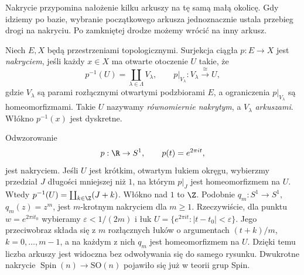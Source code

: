 Nakrycie przypomina nałożenie kilku arkuszy
na tę samą małą okolicę. Gdy idziemy po bazie,
wybranie początkowego arkusza jednoznacznie
ustala przebieg drogi na nakryciu.
Po zamkniętej drodze możemy wrócić na inny arkusz.

\begin{definicja}
\label{def:nakrycie}
Niech $E,X$ będą przestrzeniami topologicznymi.
Surjekcja ciągła $p:E\to X$ jest \emph{nakryciem},
jeśli każdy $x\in X$ ma otwarte otoczenie $U$
takie, że
\[
 p^{-1}(U)=\coprod_{\lambda\in\Lambda}V_\lambda,
 \qquad
 p|_{V_\lambda}:V_\lambda\xrightarrow{\cong}U,
\]
gdzie $V_\lambda$ są parami rozłącznymi
otwartymi podzbiorami $E$, a ograniczenia $p|_{V_\lambda}$
są homeomorfizmami.
Takie $U$ nazywamy \emph{równomiernie nakrytym},
a $V_\lambda$ \emph{arkuszami}.
Włókno $p^{-1}(x)$ jest dyskretne.
\end{definicja}

\begin{przyklad}
\label{prz:exp-nakrycie}
Odwzorowanie
\[
 p:\R\to S^1,\qquad p(t)=e^{2\pi i t},
\]
jest nakryciem. Jeśli $U$ jest krótkim,
otwartym łukiem okręgu, wybierzmy przedział
$J$ długości mniejszej niż $1$, na którym
$p|_J$ jest homeomorfizmem na $U$.
Wtedy $p^{-1}(U)=\coprod_{k\in\Z}(J+k)$.
Włókno nad $1$ to $\Z$.
Podobnie $q_m:S^1\to S^1$, $q_m(z)=z^m$,
jest $m$-krotnym nakryciem dla $m\geq1$.
Rzeczywiście, dla punktu $w=e^{2\pi i t_0}$
wybieramy $\varepsilon<1/(2m)$ i łuk
$U=\{e^{2\pi i t}:|t-t_0|<\varepsilon\}$.
Jego przeciwobraz składa się z $m$ rozłącznych łuków
o argumentach $(t+k)/m$, $k=0,\ldots,m-1$,
a na każdym z nich $q_m$ jest homeomorfizmem
na $U$. Dzięki temu liczba arkuszy jest
widoczna bez odwoływania się do samego rysunku.
Dwukrotne nakrycie $\operatorname{Spin}(n)
\to\mathrm{SO}(n)$ pojawiło się już w teorii grup Spin.
\end{przyklad}

